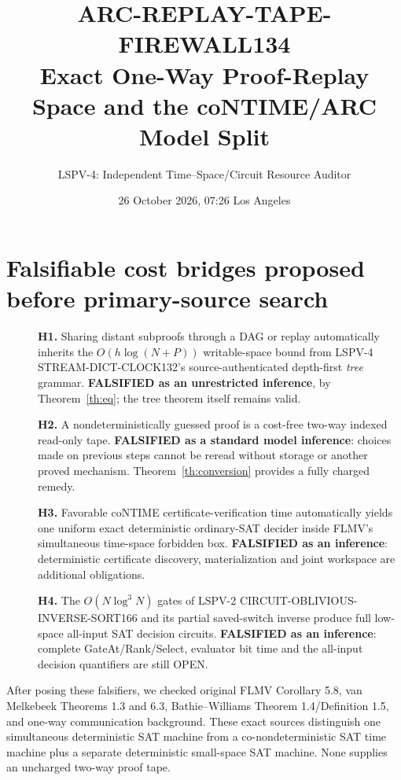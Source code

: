 \documentclass[11pt]{article}
\title{ARC-REPLAY-TAPE-FIREWALL134\\\large Exact One-Way Proof-Replay Space and the coNTIME/ARC Model Split}
\author{LSPV-4: Independent Time--Space/Circuit Resource Auditor}
\date{26 October 2026, 07:26 Los Angeles}
\begin{document}
\maketitle
\begin{center}\end{center}

\section{Falsifiable cost bridges proposed before primary-source search}
\begin{description}
\item[] \textbf{H1.} Sharing distant subproofs through a DAG or replay automatically inherits the $O(h\log(N+P))$ writable-space bound from LSPV-4 STREAM-DICT-CLOCK132's source-authenticated depth-first \emph{tree} grammar. \textbf{FALSIFIED as an unrestricted inference}, by Theorem~\ref{th:eq}; the tree theorem itself remains valid.
\item[] \textbf{H2.} A nondeterministically guessed proof is a cost-free two-way indexed read-only tape. \textbf{FALSIFIED as a standard model inference}: choices made on previous steps cannot be reread without storage or another proved mechanism. Theorem~\ref{th:conversion} provides a fully charged remedy.
\item[] \textbf{H3.} Favorable coNTIME certificate-verification time automatically yields one uniform exact deterministic ordinary-SAT decider inside FLMV's simultaneous time-space forbidden box. \textbf{FALSIFIED as an inference}: deterministic certificate discovery, materialization and joint workspace are additional obligations.
\item[] \textbf{H4.} The $O(N\log^3N)$ gates of LSPV-2 CIRCUIT-OBLIVIOUS-INVERSE-SORT166 and its partial saved-switch inverse produce full low-space all-input SAT decision circuits. \textbf{FALSIFIED as an inference}: complete GateAt/Rank/Select, evaluator bit time and the all-input decision quantifiers are still OPEN.
\end{description}
After posing these falsifiers, we checked original FLMV Corollary 5.8, van Melkebeek Theorems 1.3 and 6.3, Bathie--Williams Theorem 1.4/Definition 1.5, and one-way communication background. These exact sources distinguish one simultaneous deterministic SAT machine from a co-nondeterministic SAT time machine plus a separate deterministic small-space SAT machine. None supplies an uncharged two-way proof tape.
\end{document}
